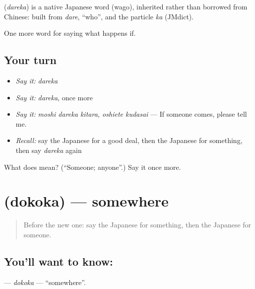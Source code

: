 \begin{cousinweb}
\textbf{} (\emph{dareka}) is a native Japanese word (wago), inherited rather than borrowed from Chinese: built from \emph{dare}, \textquotedblleft{}who\textquotedblright{}, and the particle \emph{ka} (JMdict).
\end{cousinweb}

\begin{grammarlens}[title={What you've built}]
One more word for saying what happens if.
\end{grammarlens}

\subsection*{Your turn}
\begin{itemize}
\raggedright
  \item \emph{Say it:} \emph{dareka}
  \item \emph{Say it:} \emph{dareka}, once more
  \item \emph{Say it:} \emph{moshi dareka kitara, oshiete kudasai} — If someone comes, please tell me.
  \item \emph{Recall:} say the Japanese for a good deal, then the Japanese for something, then say \emph{dareka} again
\end{itemize}

\begin{tcolorbox}[breakable,colback=teal!4,colframe=teal!35!black,title={Before you move on}]
What does  mean? (\textquotedblleft{}Someone; anyone\textquotedblright{}.) Say it once more.
\end{tcolorbox}
\section[\texorpdfstring{\ja{どこか} (dokoka)}{どこか (dokoka)}]{ (dokoka) — somewhere}

\label{lesson:JA-C522-dokoka}



\begin{quote}
Before the new one: say the Japanese for something, then the Japanese for someone.
\end{quote}

\subsection*{You'll want to know: }
\textbf{} — \emph{dokoka} — \textquotedblleft{}somewhere\textquotedblright{}.

